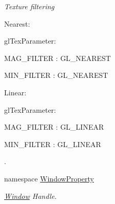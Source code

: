 \begin{DoxyCompactItemize}
\begin{DoxyCompactList}\small\item\em Texture filtering \par
 Nearest: \par
 glTexParameter: \par
 MAG\_\-FILTER : GL\_\-NEAREST \par
 MIN\_\-FILTER : GL\_\-NEAREST \par
 \par
 Linear: \par
 glTexParameter: \par
 MAG\_\-FILTER : GL\_\-LINEAR \par
 MIN\_\-FILTER : GL\_\-LINEAR \par
 \par
. \item\end{DoxyCompactList}\item 
namespace \hyperlink{namespace_f2_c_1_1_window_property}{WindowProperty}


\begin{DoxyCompactList}\small\item\em \hyperlink{class_f2_c_1_1_window}{Window} Handle. \item\end{DoxyCompactList}\end{DoxyCompactItemize}
